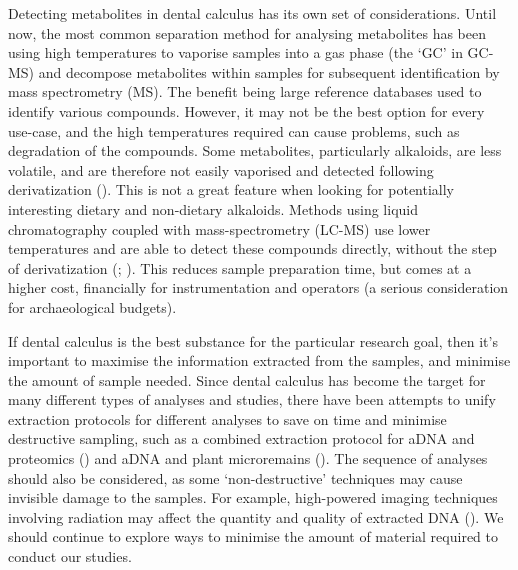 \documentclass[
  b5paper,
]{book}
\begin{document}
Detecting metabolites in dental calculus has its own set of
considerations. Until now, the most common separation method for
analysing metabolites has been using high temperatures to vaporise
samples into a gas phase (the `GC' in GC-MS) and decompose metabolites
within samples for subsequent identification by mass spectrometry (MS).
The benefit being large reference databases used to identify various
compounds. However, it may not be the best option for every use-case,
and the high temperatures required can cause problems, such as
degradation of the compounds. Some metabolites, particularly alkaloids,
are less volatile, and are therefore not easily vaporised and detected
following derivatization
(). This is not a great feature when looking for
potentially interesting dietary and non-dietary alkaloids. Methods using
liquid chromatography coupled with mass-spectrometry (LC-MS) use lower
temperatures and are able to detect these compounds directly, without
the step of derivatization
(; ). This reduces sample preparation time, but comes
at a higher cost, financially for instrumentation and operators (a
serious consideration for archaeological budgets).

If dental calculus is the best substance for the particular research
goal, then it's important to maximise the information extracted from the
samples, and minimise the amount of sample needed. Since dental calculus
has become the target for many different types of analyses and studies,
there have been attempts to unify extraction protocols for different
analyses to save on time and minimise destructive sampling, such as a
combined extraction protocol for aDNA and proteomics
() and
aDNA and plant microremains
(). The
sequence of analyses should also be considered, as some
`non-destructive' techniques may cause invisible damage to the samples.
For example, high-powered imaging techniques involving radiation may
affect the quantity and quality of extracted DNA
(). We should
continue to explore ways to minimise the amount of material required to
conduct our studies.
\end{document}

